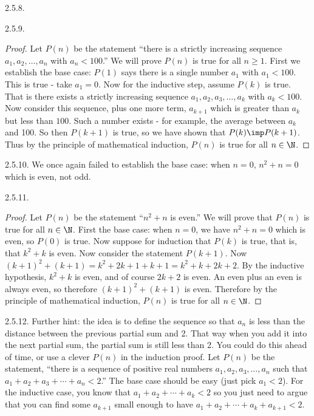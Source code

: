 \begin {itemize}
\begin{ans}{2.5.8.}
\end{ans}
\begin{ans}{2.5.9.}
		\begin{proof}
		 Let $P(n)$ be the statement ``there is a strictly increasing sequence $a_1, a_2, \ldots, a_n$ with $a_n < 100$.''  We will prove $P(n)$ is true for all $n \ge 1$. First we establish the base case: $P(1)$ says there is a single number $a_1$ with $a_1 < 100$.  This is true - take $a_1 = 0$.  Now for the inductive step, assume $P(k)$ is true.  That is there exists a strictly increasing sequence $a_1, a_2, a_3, \ldots, a_k$ with $a_k < 100$.  Now consider this sequence, plus one more term, $a_{k+1}$ which is greater than $a_k$ but less than $100$.  Such a number exists - for example, the average between $a_k$ and 100.  So then $P(k+1)$ is true, so we have shown that $P(k) \imp P(k+1)$.  Thus by the principle of mathematical induction, $P(n)$ is true for all $n \in \N$.
		\end{proof}

	
\end{ans}
\begin{ans}{2.5.10.}
  		We once again failed to establish the base case: when $n = 0$, $n^2 + n = 0$ which is even, not odd.
  	
\end{ans}
\begin{ans}{2.5.11.}
		  \begin{proof}
		    Let $P(n)$ be the statement ``$n^2 + n$ is even.''  We will prove that $P(n)$ is true for all $n \in \N$.  First the base case: when $n = 0$, we have $n^2 + n = 0$ which is even, so $P(0)$ is true.  Now suppose for induction that $P(k)$ is true, that is, that $k^2 + k$ is even.  Now consider the statement $P(k+1)$.  Now $(k+1)^2 + (k+1) = k^2 + 2k + 1 + k + 1 = k^2 + k + 2k + 2$.  By the inductive hypothesis, $k^2 + k$ is even, and of course $2k + 2$ is even.  An even plus an even is always even, so therefore $(k+1)^2 + (k+1)$ is even.  Therefore by the principle of mathematical induction, $P(n)$ is true for all $n \in \N$.
		  \end{proof}
	
\end{ans}
\begin{ans}{2.5.12.}
		 Further hint: the idea is to define the sequence so that $a_n$ is less than the distance between the previous partial sum and 2.  That way when you add it into the next partial sum, the partial sum is still less than 2.  You could do this ahead of time, or use a clever $P(n)$ in the induction proof.  Let $P(n)$ be the statement, ``there is a sequence of positive real numbers $a_1, a_2, a_3, \ldots, a_n$ such that $a_1 + a_2 + a_3 + \cdots + a_n < 2$.''  The base case should be easy (just pick $a_1 < 2$).  For the inductive case, you know that $a_1 + a_2 + \cdots + a_k < 2$ so you just need to argue that you can find some $a_{k+1}$ small enough to have $a_1 + a_2 + \cdots +a_k + a_{k+1} < 2$.
	

\end{ans}
\end{itemize}
